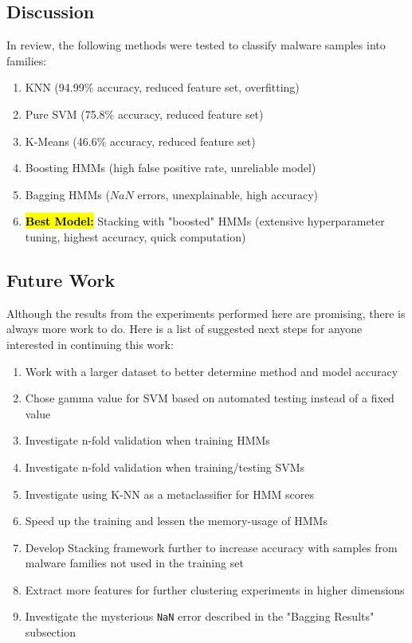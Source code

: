 \documentclass[12pt]{article}
\begin{document}
  \subsection{Discussion}
    In review, the following methods were tested to classify malware samples into families:
    \begin{enumerate}
      \item KNN (94.99\% accuracy, reduced feature set, overfitting)
      \item Pure SVM (75.8\% accuracy, reduced feature set)
      \item K-Means (46.6\% accuracy, reduced feature set)
      \item Boosting HMMs (high false positive rate, unreliable model)
      \item Bagging HMMs ($NaN$ errors, unexplainable, high accuracy)
      \item \hl{\textbf{Best Model:}} Stacking with "boosted" HMMs (extensive hyperparameter tuning, highest accuracy, quick computation)
    \end{enumerate}
  \subsection{Future Work}
  Although the results from the experiments performed here are promising, there is always more work to do. Here is a list of suggested next steps for anyone interested in continuing this work: 
  \begin{enumerate}
    \item Work with a larger dataset to better determine method and model accuracy
    \item Chose gamma value for SVM based on automated testing instead of a fixed value
    \item Investigate n-fold validation when training HMMs
    \item Investigate n-fold validation when training/testing SVMs
    \item Investigate using K-NN as a metaclassifier for HMM scores
    \item Speed up the training and lessen the memory-usage of HMMs
    \item Develop Stacking framework further to increase accuracy with samples from malware families not used in the training set
    \item Extract more features for further clustering experiments in higher dimensions
    \item Investigate the mysterious \texttt{NaN} error described in the "Bagging Results" subsection
  \end{enumerate}
\end{document}
